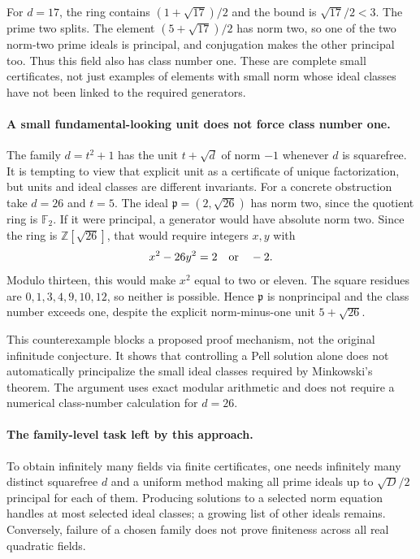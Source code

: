 \documentclass[11pt,a4paper]{article}
\begin{document}
For $d=17$, the ring contains $(1+\sqrt{17})/2$ and the bound is
$\sqrt{17}/2<3$. The prime two splits. The element
$(5+\sqrt{17})/2$ has norm two, so one of the two norm-two prime
ideals is principal, and conjugation makes the other principal too.
Thus this field also has class number one. These are complete small
certificates, not just examples of elements with small norm whose
ideal classes have not been linked to the required generators.

\paragraph{A small fundamental-looking unit does not force class number one.}
The family $d=t^2+1$ has the unit $t+\sqrt d$ of norm $-1$ whenever
$d$ is squarefree. It is tempting to view that explicit unit as a
certificate of unique factorization, but units and ideal classes are
different invariants. For a concrete obstruction take $d=26$ and $t=5$.
The ideal $\mathfrak p=(2,\sqrt{26})$ has norm two, since the quotient
ring is $\mathbb F_2$. If it were principal, a generator would have
absolute norm two. Since the ring is $\mathbb Z[\sqrt{26}]$, that
would require integers $x,y$ with
\[
                         x^2-26y^2=2\quad\hbox{or}\quad-2.
\]
Modulo thirteen, this would make $x^2$ equal to two or eleven. The
square residues are $0,1,3,4,9,10,12$, so neither is possible.
Hence $\mathfrak p$ is nonprincipal and the class number exceeds one,
despite the explicit norm-minus-one unit $5+\sqrt{26}$.

This counterexample blocks a proposed proof mechanism, not the original
infinitude conjecture. It shows that controlling a Pell solution alone
does not automatically principalize the small ideal classes required by
Minkowski's theorem. The argument uses exact modular arithmetic and
does not require a numerical class-number calculation for $d=26$.

\paragraph{The family-level task left by this approach.}
To obtain infinitely many fields via finite certificates, one needs
infinitely many distinct squarefree $d$ and a uniform method making all
prime ideals up to $\sqrt D/2$ principal for each of them. Producing
solutions to a selected norm equation handles at most selected ideal
classes; a growing list of other ideals remains. Conversely, failure
of a chosen family does not prove finiteness across all real quadratic
fields.
\end{document}
